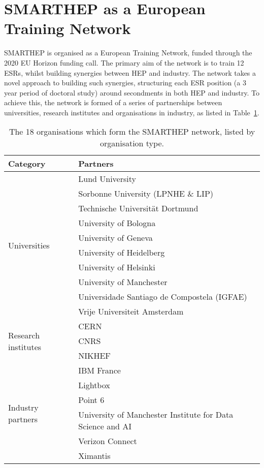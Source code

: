 \section{SMARTHEP as a European Training Network}
\label{network}
SMARTHEP is organised as a European Training Network, funded through the 2020 EU Horizon funding call. The primary aim of the network is to train 12 ESRs, whilst building synergies between HEP and industry. The network takes a novel approach to building such synergies, structuring each ESR position (a 3 year period of doctoral study) around secondments in both HEP and industry. To achieve this, the network is formed of a series of partnerships between universities, research institutes and organisations in industry, as listed in Table~\ref{partners}.

\begin{table}[h!]
    \centering
    \footnotesize
    \begin{tabular}{p{2.5cm}p{7cm}}
    \hline
    Category & Partners \\\hline
    \multirow{10}{*}{Universities} & Lund University \\
    & Sorbonne University (LPNHE \& LIP) \\
    & Technische Universit\"at Dortmund \\
    & University of Bologna \\
    & University of Geneva \\
    & University of Heidelberg \\
    & University of Helsinki \\
    & University of Manchester \\
    & Universidade Santiago de Compostela (IGFAE) \\
    & Vrije Universiteit Amsterdam \\\hline
    \multirow{3}{*}{Research institutes} & CERN \\
    & CNRS \\
    & NIKHEF  \\\hline
    \multirow{6}{*}{Industry partners} & IBM France \\
    & Lightbox \\
    & Point 6 \\
    & University of Manchester Institute for Data Science and AI \\ 
    & Verizon Connect \\
    & Ximantis\\\hline
    \end{tabular}
    \caption{The 18 organisations which form the SMARTHEP network, listed by organisation type.}
    \label{partners}       
\end{table}

